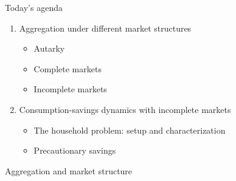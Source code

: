\documentclass[9pt]{beamer}
\newcommand{\bit}{\begin{itemize}}
\newcommand{\eit}{\end{itemize}}
\newcommand{\ben}{\begin{enumerate}}
\newcommand{\een}{\end{enumerate}}
\begin{document}
\begin{frame}{Today's agenda}

\ben
\setlength\itemsep{2em}

\item Aggregation under different market structures
	\bit
	\setlength\itemsep{0.5em}
		\item Autarky
		\item Complete markets
		\item Incomplete markets
	\eit

\item Consumption-savings dynamics with incomplete markets
\bit
\setlength\itemsep{0.5em}
	\item The household problem: setup and characterization 
	\item Precautionary savings
\eit

\een

\end{frame}



\begin{frame}

\begin{center}
	\huge Aggregation and market structure \normalfont
\end{center}

\end{frame}
\end{document}
